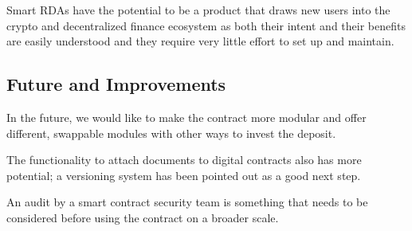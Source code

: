 \documentclass[12pt,a4paper,titlepage,oneside,english]{article}
\begin{document}
Smart RDAs have the potential to be a product that draws new users into the crypto and decentralized finance ecosystem as both their intent and their benefits are easily understood and they require very little effort to set up and maintain.

\subsection{Future and Improvements}
In the future, we would like to make the contract more modular and offer different, swappable modules with other ways to invest the deposit. 

The functionality to attach documents to digital contracts also has more potential; a versioning system has been pointed out as a good next step.

An audit by a smart contract security team is something that needs to be considered before using the contract on a broader scale.



\newpage
\setcounter{page}{1}
\onehalfspacing
{}



\end{document}

